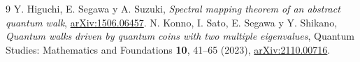 \documentclass[11pt,a4paper]{article}
\numberwithin{equation}{section}
\begin{document}
\begin{thebibliography}{9}
 Y. Higuchi, E. Segawa y A. Suzuki,
\emph{Spectral mapping theorem of an abstract quantum walk},
\href{https://arxiv.org/abs/1506.06457}{arXiv:1506.06457}.
 N. Konno, I. Sato, E. Segawa y Y. Shikano,
\emph{Quantum walks driven by quantum coins with two multiple eigenvalues},
Quantum Studies: Mathematics and Foundations \textbf{10}, 41--65 (2023),
\href{https://arxiv.org/abs/2110.00716}{arXiv:2110.00716}.
\end{thebibliography}
\end{document}
